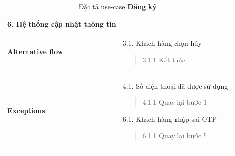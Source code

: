 \begin{longtable}{| p{} | p{} |}
                    6. Hệ thống cập nhật thông tin
                \\
                \hline
                \begin{flushleft}
                    \textbf{Alternative flow}
                \end{flushleft}
                &
                3.1. Khách hàng chọn hủy
                    \begin{quote} 
                    3.1.1 Kết thúc
                    \end{quote}
                \\
                \hline
                \begin{flushleft}
                    \textbf{Exceptions} 
                \end{flushleft}
                &
                4.1. Số điện thoại đã được sử dụng
                    \begin{quote} 
                    4.1.1 Quay lại bước 1
                    \end{quote}
                6.1. Khách hàng nhập sai OTP
                    \begin{quote} 
                    6.1.1 Quay lại bước 5
                    \end{quote}
                \\
                \hline
                \caption{Đặc tả use-case \textbf{Đăng ký}}
            \end{longtable}
        

